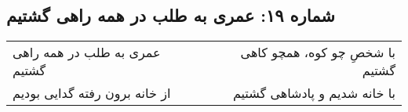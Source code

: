 \begin{center}
\section*{شماره ۱۹: عمری به طلب در همه راهی گشتیم}
\label{sec:019}
\begin{longtable}{l p{0.5cm} r}
عمری به طلب در همه راهی گشتیم
&&
با شخصِ چو کوه، همچو کاهی گشتیم
\\
از خانه برون رفته گدایی بودیم
&&
با خانه شدیم و پادشاهی گشتیم
\\
\end{longtable}
\end{center}
